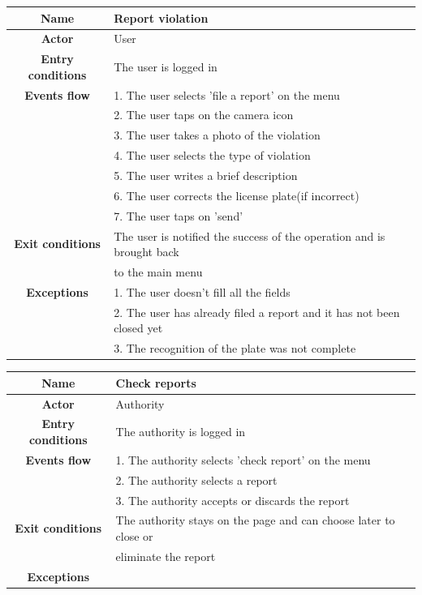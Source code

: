 \vspace{1.5cm}
\begin{flushleft}
\begin{tabular}{|c|l|}
\hline
\textbf{Name} & Report violation\\ \hline
\textbf{Actor} & User\\ \hline
\textbf{Entry conditions} &  The user is logged in\\ \hline
\textbf{Events flow} & 1. The user selects 'file a report' on the menu\\& 2. The user taps on the camera icon\\& 3. The user takes a photo of the violation\\& 4. The user selects the type of violation\\& 5. The user writes a brief description\\& 6. The user corrects the license plate(if incorrect)\\& 7. The user taps on 'send'\\ \hline
\textbf{Exit conditions} &  The user is notified the success of the operation and is brought back\\ & to the main menu\\ \hline
\textbf{Exceptions} & 1. The user doesn't fill all the fields\\& 2. The user has already filed a report and it has not been closed yet\\& 3. The recognition of the plate was not complete\\
\hline 
\end{tabular}
\end{flushleft}
\newpage
\begin{flushleft}
\begin{tabular}{|c|l|}
\hline
\textbf{Name} & Check reports\\ \hline
\textbf{Actor} & Authority\\ \hline
\textbf{Entry conditions} &  The authority is logged in\\ \hline
\textbf{Events flow} & 1. The authority selects 'check report' on the menu\\& 2. The authority selects a report\\& 3. The authority accepts or discards the report\\ \hline
\textbf{Exit conditions} &  The authority stays on the page and can choose later to close or\\& eliminate the report\\ \hline
\textbf{Exceptions} & \\
\hline 
\end{tabular} 
\end{flushleft}

